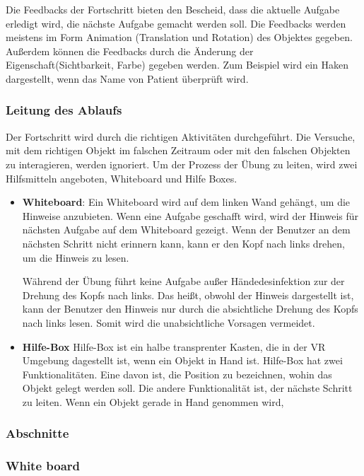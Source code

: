   Die Feedbacks der Fortschritt bieten den Bescheid, dass die aktuelle Aufgabe erledigt wird, die nächste Aufgabe gemacht werden soll. Die Feedbacks werden meistens im Form Animation (Translation und Rotation) des Objektes gegeben. Außerdem können die Feedbacks durch die Änderung der Eigenschaft(Sichtbarkeit, Farbe) gegeben werden. Zum Beispiel wird ein Haken dargestellt, wenn das Name von Patient überprüft wird.
  
  \subsubsection{Leitung des Ablaufs}
  Der Fortschritt wird durch die richtigen Aktivitäten durchgeführt. Die Versuche, mit dem richtigen Objekt im falschen Zeitraum oder mit den falschen Objekten zu interagieren, werden ignoriert. Um der Prozess der Übung zu leiten, wird zwei Hilfsmitteln angeboten, Whiteboard und Hilfe Boxes.
  \begin{itemize}
      \item \textbf{Whiteboard}:
      Ein Whiteboard wird auf dem linken Wand gehängt, um die Hinweise anzubieten. Wenn eine Aufgabe geschafft wird, wird der Hinweis für nächsten Aufgabe auf dem Whiteboard gezeigt. Wenn der Benutzer an dem nächsten Schritt nicht erinnern kann, kann er den Kopf nach links drehen, um die Hinweis zu lesen.
      
      Während der Übung führt keine Aufgabe außer Händedesinfektion zur der Drehung des Kopfs nach links. Das heißt, obwohl der Hinweis dargestellt ist, kann der Benutzer den Hinweis nur durch die absichtliche Drehung des Kopfs nach links lesen. Somit wird die unabsichtliche Vorsagen vermeidet.
      
      \item \textbf{Hilfe-Box}
      Hilfe-Box ist ein halbe transprenter Kasten, die in der VR Umgebung dagestellt ist, wenn ein Objekt in Hand ist. Hilfe-Box hat zwei Funktionalitäten. Eine davon ist, die Position zu bezeichnen, wohin das Objekt gelegt werden soll. Die andere Funktionalität ist, der nächste Schritt zu leiten. Wenn ein Objekt gerade in Hand genommen wird, 
      
      
  \end{itemize}
  
  \subsubsection{Abschnitte}
  
  \subsubsection{White board}
  
